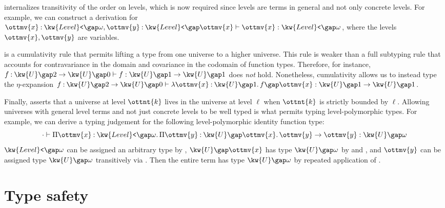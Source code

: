 \documentclass[a4paper,UKenglish,cleveref,autoref,thm-restate]{lipics-v2021}
\begin{document}
 internalizes transitivity of the order on levels,
which is now required since levels are terms in general and not only concrete levels.
For example, we can construct a derivation for $   \ottmv{x}  \mathbin{:}   \kw{Level}\texttt{<} \gap   \omega    ,  \ottmv{y}  \mathbin{:}   \kw{Level}\texttt{<} \gap  \ottmv{x}    \vdash  \ottmv{x}  \mathrel{:}   \kw{Level}\texttt{<} \gap   \omega   $,
where the levels $\ottmv{x}, \ottmv{y}$ are variables.

 is a cumulativity rule that permits lifting a type
from one universe to a higher universe.
This rule is weaker than a full subtyping rule that accounts for
contravariance in the domain and covariance in the codomain of function types.
Therefore, for instance, $  f  \mathbin{:}    \kw{U} \gap   2    \to   \kw{U} \gap   0      \vdash  f  \mathrel{:}    \kw{U} \gap   1    \to   \kw{U} \gap   1    $ does \emph{not} hold.
Nonetheless, cumulativity allows us to instead type the $\eta$-expansion
$  f  \mathbin{:}    \kw{U} \gap   2    \to   \kw{U} \gap   0      \vdash    \lambda  \ottmv{x}  \mathbin{:}   \kw{U} \gap   1    \mathpunct{.}  f   \gap  \ottmv{x}   \mathrel{:}    \kw{U} \gap   1    \to   \kw{U} \gap   1    $.

Finally,  asserts that a universe at level $\ottnt{k}$
lives in the universe at level $\ell$ when $\ottnt{k}$ is strictly bounded by $\ell$.
Allowing universes with general level terms and not just concrete levels
to be well typed is what permits typing level-polymorphic types.
For example, we can derive a typing judgement for
the following level-polymorphic identity function type:
\begin{equation*}
    \cdot   \vdash    \Pi  \ottmv{x}  \mathbin{:}   \kw{Level}\texttt{<} \gap   \omega    \mathpunct{.}   \Pi  \ottmv{y}  \mathbin{:}   \kw{U} \gap  \ottmv{x}   \mathpunct{.}  \ottmv{y}    \to  \ottmv{y}   \mathrel{:}   \kw{U} \gap   \omega   
\end{equation*}
$ \kw{Level}\texttt{<} \gap   \omega  $ can be assigned an arbitrary type by ,
$ \kw{U} \gap  \ottmv{x} $ has type $ \kw{U} \gap   \omega  $ by  and ,
and $\ottmv{y}$ can be assigned type $ \kw{U} \gap   \omega  $ transitively
via .
Then the entire term has type $ \kw{U} \gap   \omega  $ by repeated application of .

\section{Type safety} \label{sec:safety}
\end{document}
